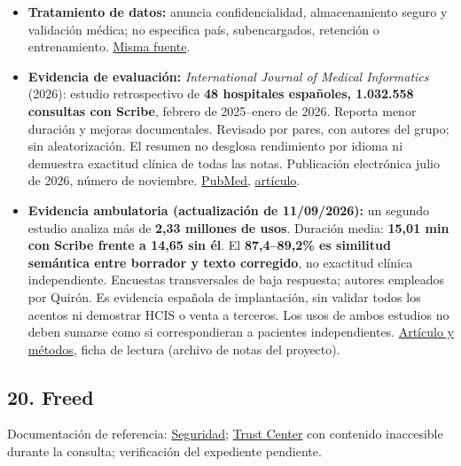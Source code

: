 \begin{itemize}
\item \textbf{Tratamiento de datos:} anuncia confidencialidad, almacenamiento seguro y validación médica; no especifica país, subencargados, retención o entrenamiento. \href{https://www.quironsalud.com/es/comunicacion/actualidad/quironsalud-redisena-modelo-asistencial-reafirmandose-human}{Misma fuente}.
\item \textbf{Evidencia de evaluación:} \emph{International Journal of Medical Informatics} (2026): estudio retrospectivo de \textbf{48 hospitales españoles, 1.032.558 consultas con Scribe}, febrero de 2025–enero de 2026. Reporta menor duración y mejoras documentales. Revisado por pares, con autores del grupo; sin aleatorización. El resumen no desglosa rendimiento por idioma ni demuestra exactitud clínica de todas las notas. Publicación electrónica julio de 2026, número de noviembre. \href{https://pubmed.ncbi.nlm.nih.gov/42456601/}{PubMed}, \href{https://doi.org/10.1016/j.ijmedinf.2026.106584}{artículo}.
\item \textbf{Evidencia ambulatoria (actualización de 11/\allowbreak{}09/\allowbreak{}2026):} un segundo estudio analiza más de \textbf{2,33 millones de usos}. Duración media: \textbf{15,01 min con Scribe frente a 14,65 sin él}. El \textbf{87,4–89,2\% es similitud semántica entre borrador y texto corregido}, no exactitud clínica independiente. Encuestas transversales de baja respuesta; autores empleados por Quirón. Es evidencia española de implantación, sin validar todos los acentos ni demostrar HCIS o venta a terceros. Los usos de ambos estudios no deben sumarse como si correspondieran a pacientes independientes. \href{https://doi.org/10.3389/fdgth.2026.1874919}{Artículo y métodos}, ficha de lectura (archivo de notas del proyecto).
\end{itemize}

\subsection*{20. Freed}
\label{provider:20}

Documentación de referencia: \href{https://www.getfreed.ai/security}{Seguridad}; \href{https://app.drata.com/trust/1d1964c2-b90c-41ac-8d7c-2ea7f5af001c}{Trust Center} con contenido inaccesible durante la consulta; verificación del expediente pendiente.

